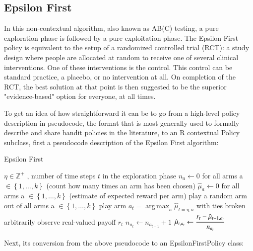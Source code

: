 \documentclass[nojss]{jss}\usepackage[]{graphicx}\usepackage[]{color}
\DeclareMathOperator*{\argmax}{arg\,max}
\begin{document}
\subsection{Epsilon First}

In this non-contextual algorithm, also known as AB(C) testing, a pure exploration phase is followed by a pure exploitation phase. The Epsilon First policy is equivalent to the setup of a randomized controlled trial (RCT): a study design where people are allocated at random to receive one of several clinical interventions. One of these interventions is the control. This control can be standard practice, a placebo, or no intervention at all. On completion of the RCT, the best solution at that point is then suggested to be the superior "evidence-based" option for everyone, at all times.

To get an idea of how straightforward it can be to go from a high-level policy description in pseudocode, the format that is most generally used to formally describe and share bandit policies in the literature, to an R  contextual Policy subclass, first a pseudocode description of the Epsilon First algorithm:

\begin{algorithm}[H]
\caption{Epsilon First}
\label{Alg:EpsilonFirst}
\begin{algorithmic}
\REQUIRE \(   \eta \in \mathbb{Z}^{+} \)  , number of time steps $t$ in the exploration phase
\STATE \( n_{a} \leftarrow 0 \) for all arms a \(  \in \left\{ 1, \dots, k \right\} \)  (count how many times an arm has been chosen)
\STATE \( \hat{\mu}_{a} \leftarrow 0 \) for all arms a  \(   \in \left\{ 1, \dots, k \right\} \)  (estimate of expected reward per arm)
	       \STATE play a random arm out of all arms a \(   \in \left\{ 1, \dots, k \right\} \)
	\ELSE
	        \STATE play arm \(a_t = \argmax_a  \hat{\mu}_{t=\eta,a}  \) with ties broken arbitrarily
	\ENDIF
	\STATE observe real-valued payoff $r_t$
	\STATE \( n_{a_{t}} \leftarrow n_{a_{t-1}} + 1  \)
   \STATE \( \hat{\mu}_{t,a_{t}} \leftarrow   \cfrac{r_t - \hat{\mu}_{t-1,a_{t}} }{n_{a_{t}}}   \)
\ENDFOR
\end{algorithmic}
\end{algorithm}


Next, its conversion from the above pseudocode to an EpsilonFirstPolicy class:
\end{document}
